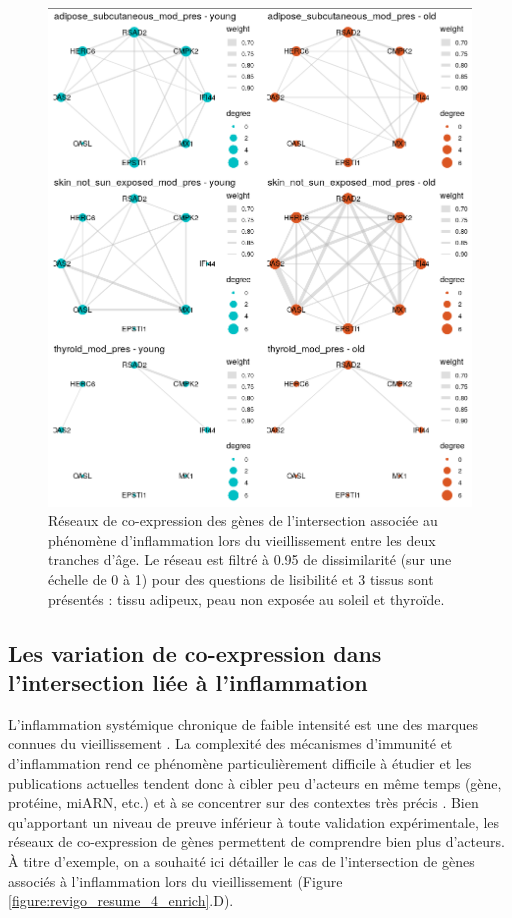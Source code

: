 \begin{figure}[p]
    \centering
    \includegraphics[width=1\textwidth]{img/chap2/chap2_graphs_intersection_plot_adipo_skinnosun_thyr.png}
    \caption[Réseaux de co-expression des gènes de l'intersection associée au phénomène d'inflammation lors du vieillissement entre les deux tranches d'âge]{Réseaux de co-expression des gènes de l'intersection associée au phénomène d'inflammation lors du vieillissement entre les deux tranches d'âge. Le réseau est filtré à 0.95 de dissimilarité (sur une échelle de 0 à 1) pour des questions de lisibilité et 3 tissus sont présentés : tissu adipeux, peau non exposée au soleil et thyroïde.}
    \label{figure:graphs_intersection_plot_adipo_skinnosun_thyr}
\end{figure}


\subsection{Les variation de co-expression dans l'intersection liée à l'inflammation}

L'inflammation systémique chronique de faible intensité est une des marques connues du vieillissement . La complexité des mécanismes d'immunité et d'inflammation rend ce phénomène particulièrement difficile à étudier et les publications actuelles tendent donc à cibler peu d'acteurs en même temps (gène, protéine, miARN, etc.) et à se concentrer sur des contextes très précis . Bien qu'apportant un niveau de preuve inférieur à toute validation expérimentale, les réseaux de co-expression de gènes permettent de comprendre bien plus d'acteurs. À titre d'exemple, on a souhaité ici détailler le cas de l'intersection de gènes associés à l'inflammation lors du vieillissement (Figure \ref{figure:revigo_resume_4_enrich}.D).



